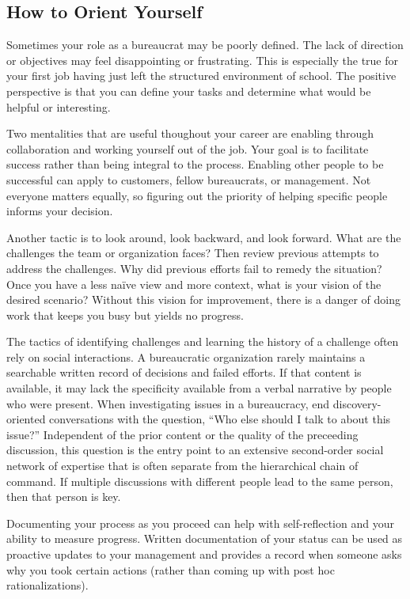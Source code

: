 \subsection*{How to Orient Yourself}

Sometimes your role as a bureaucrat may be poorly defined. The lack of direction or objectives may feel disappointing or frustrating. This is especially the true for your first job having just left the structured environment of school. The positive perspective is that you can define your tasks and determine what would be helpful or interesting. 

Two mentalities that are useful thoughout your career are enabling through collaboration and working yourself out of the job. Your goal is to facilitate success rather than being integral to the process. Enabling other people to be successful can apply to customers, fellow bureaucrats, or management. Not everyone matters equally, so figuring out the priority of helping specific people informs your decision. 

Another tactic is to look around, look backward, and look forward. What are the challenges the team or organization faces? Then review previous attempts to address the challenges. Why did previous efforts fail to remedy the situation? Once you have a less na\"ive view and more context, what is your vision of the desired scenario? Without this vision for improvement, there is a danger of doing work that keeps you busy but yields no progress. 

The tactics of identifying challenges and learning the history of a challenge often rely on social interactions. A bureaucratic organization rarely maintains a searchable written record of decisions and failed efforts. If that content is available, it may lack the specificity available from a verbal narrative by people who were present. When investigating issues in a bureaucracy, end discovery-oriented conversations with the question, ``Who else should I talk to about this issue?'' Independent of the prior content or the quality of the preceeding discussion, this question is the entry point to an extensive second-order social network of expertise that is often separate from the hierarchical chain of command. If multiple  discussions with different people lead to the same person, then that person is key. 

Documenting your process as you proceed can help with self-reflection and your ability to measure progress. Written documentation of your status can be used as proactive updates to your management and provides a record when someone asks  why you took certain actions (rather than coming up with post hoc rationalizations).

